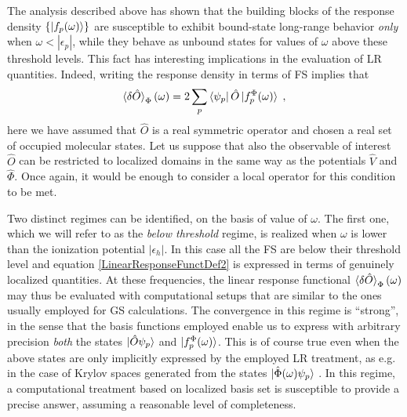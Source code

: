 \documentclass[reprint,aps,prb]{revtex4-1}
\newcommand{\eps}{\epsilon}
\newcommand{\be}{\begin{equation}}
\newcommand{\ee}{\end{equation}}
\newcommand{\lb}{\label}
\newcommand{\op}[1]{\hat {#1}}
\begin{document}
The analysis described above has shown that the building blocks of the response density $\{\ket{f_p(\omega)}\}$
are susceptible to exhibit bound-state long-range behavior \emph{only} when $\omega < |\eps_p|$,
while they behave as unbound states for values of $\omega$ above these threshold levels.
This fact has interesting implications in the evaluation of LR quantities. Indeed, writing the response
density in terms of FS implies that
\be\lb{LinearResponseFunctDef2}
\braket{\delta\op O}_\Phi(\omega) = 2 \sum_p\bra{\psi_p}\op O\ket{f_p^\Phi(\omega)}  \;,
\ee
here we have assumed that $\op O$ is a real symmetric operator and chosen a real set of occupied molecular states.
Let us suppose that also the observable of interest $\op O$ can be restricted to localized domains in the same way as the potentials $ \op V$ and $\op \Phi$.
Once again, it would be enough to consider a local operator for this condition to be met.

Two distinct regimes can be identified, on the basis of value of $\omega$.
The first one, which we will refer to as the \emph{below threshold} regime, is realized when
$\omega$ is lower than the ionization potential $|\eps_h|$.
In this case all the FS are below their threshold level and equation \eqref{LinearResponseFunctDef2}
is expressed in terms of genuinely localized
quantities. At these frequencies, the linear response functional $\braket{\delta\op O}_\Phi(\omega)$
may thus be evaluated with computational setups that
are similar to the ones usually employed for GS calculations.
The convergence in this regime is ``strong'', in the sense that the basis functions employed enable us to express
with arbitrary precision \emph{both} the states $\ket{\op O \psi_p}$ and $\ket{f_p^\Phi(\omega)}$.
This is of course true even when the above states are only implicitly expressed by the employed LR treatment,
 as e.g. in the case of Krylov spaces generated from the states $\ket{\op\Phi(\omega) \psi_p}$ \cite{baroni2006,baroni2008,linlinKPM}.
 In this regime, a computational treatment based on localized basis set is susceptible to provide a precise answer, assuming a reasonable level of completeness.
\end{document}

